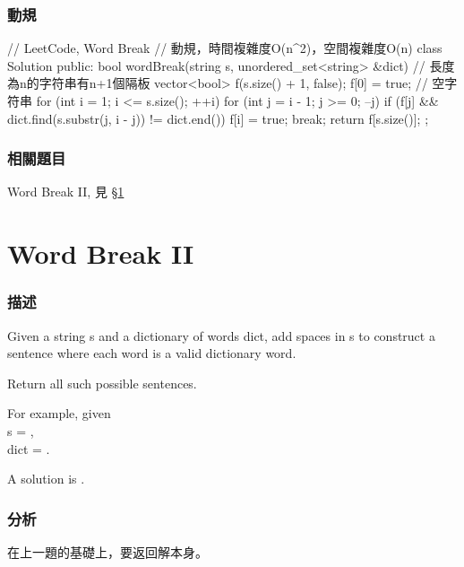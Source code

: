 \subsubsection{動規}
\begin{Code}
// LeetCode, Word Break
// 動規，時間複雜度O(n^2)，空間複雜度O(n)
class Solution {
public:
    bool wordBreak(string s, unordered_set<string> &dict) {
        // 長度為n的字符串有n+1個隔板
        vector<bool> f(s.size() + 1, false);
        f[0] = true; // 空字符串
        for (int i = 1; i <= s.size(); ++i) {
            for (int j = i - 1; j >= 0; --j) {
                if (f[j] && dict.find(s.substr(j, i - j)) != dict.end()) {
                    f[i] = true;
                    break;
                }
            }
        }
        return f[s.size()];
    }
};
\end{Code}


\subsubsection{相關題目}
\begindot
\item Word Break II, 見 \S \ref{sec:word-break-ii}
\myenddot


\section{Word Break II} %
\label{sec:word-break-ii}


\subsubsection{描述}
Given a string s and a dictionary of words dict, add spaces in s to construct a sentence where each word is a valid dictionary word.

Return all such possible sentences.

For example, given  \\
s = , \\
dict = .

A solution is .


\subsubsection{分析}
在上一題的基礎上，要返回解本身。



